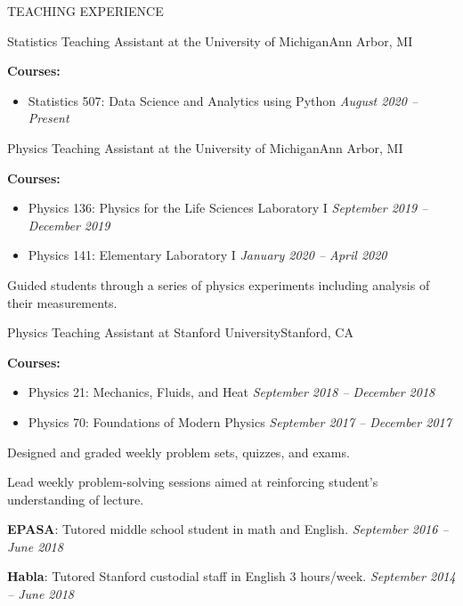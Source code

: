 \documentclass{resume} %
\begin{document}
\begin{rSection}{TEACHING EXPERIENCE} 
%
\begin{rSubsection}{Statistics Teaching Assistant at the University of Michigan}{Ann Arbor, MI}{}{}
\item \textbf{Courses:}
%
    \begin{itemize}[itemsep=-0.4em]
        \vspace*{-0.5em}
        \item Statistics 507: Data Science and Analytics using Python \hfill \textit{August 2020 -- Present}
    \end{itemize}
%
\end{rSubsection} 
%
\begin{rSubsection}{Physics Teaching Assistant at the University of Michigan}{Ann Arbor, MI}{}{}
\item \textbf{Courses:}
%
    \begin{itemize}[itemsep=-0.4em]
        \vspace*{-0.5em}
        \item Physics 136: Physics for the Life Sciences Laboratory I \hfill \textit{September 2019 -- December 2019}
        \item Physics 141: Elementary Laboratory I \hfill \textit{January 2020 -- April 2020}
    \end{itemize}
%
\item Guided students through a series of physics experiments including analysis of their measurements.
\end{rSubsection} 
%
\begin{rSubsection}{Physics Teaching Assistant at Stanford University}{Stanford, CA}{}{}
\item \textbf{Courses:}
%
    \begin{itemize}[itemsep=-0.5em]
        \vspace*{-0.5em}
        \item Physics 21: Mechanics, Fluids, and Heat \hfill \textit{September 2018 -- December 2018}
        \item Physics 70: Foundations of Modern Physics \hfill \textit{September 2017 -- December 2017}
    \end{itemize}
%
\item Designed and graded weekly problem sets, quizzes, and exams. 
\item Lead weekly problem-solving sessions aimed at reinforcing student's understanding of lecture. 
%
\end{rSubsection} 
%
\textbf{EPASA}: Tutored middle school student in math and English. \hfill {\em September 2016 -- June 2018}

\vspace*{-.15cm}
\textbf{Habla}: Tutored Stanford custodial staff in English 3 hours/week. \hfill {\em September 2014 -- June 2018}
\end{rSection}
\end{document}
